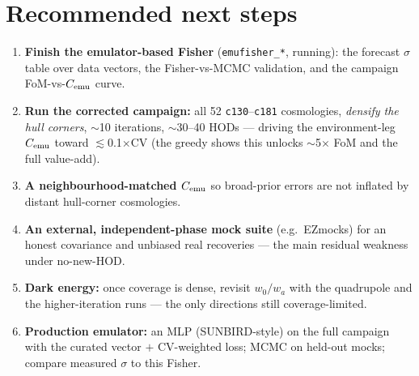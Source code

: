 \documentclass[11pt]{article}
\newcommand{\code}[1]{\texttt{#1}}
\newcommand{\Cemu}{C_{\rm emu}}
\begin{document}
\section{Recommended next steps}
\begin{enumerate}
\item \textbf{Finish the emulator-based Fisher} (\code{emufisher\_*}, running): the
  forecast $\sigma$ table over data vectors, the Fisher-vs-MCMC validation, and the
  campaign FoM-vs-$\Cemu$ curve.
\item \textbf{Run the corrected campaign:} all 52 \code{c130}--\code{c181} cosmologies,
  \emph{densify the hull corners}, $\sim$10 iterations, $\sim$30--40 HODs --- driving the
  environment-leg $\Cemu$ toward $\lesssim$0.1$\times$CV (the greedy shows this unlocks
  $\sim$5$\times$ FoM and the full value-add).
\item \textbf{A neighbourhood-matched $\Cemu$} so broad-prior errors are not inflated by
  distant hull-corner cosmologies.
\item \textbf{An external, independent-phase mock suite} (e.g.\ EZmocks) for an honest
  covariance and unbiased real recoveries --- the main residual weakness under no-new-HOD.
\item \textbf{Dark energy:} once coverage is dense, revisit $w_0/w_a$ with the quadrupole
  and the higher-iteration runs --- the only directions still coverage-limited.
\item \textbf{Production emulator:} an MLP (SUNBIRD-style) on the full campaign with the
  curated vector $+$ CV-weighted loss; MCMC on held-out mocks; compare measured $\sigma$
  to this Fisher.
\end{enumerate}
\end{document}
